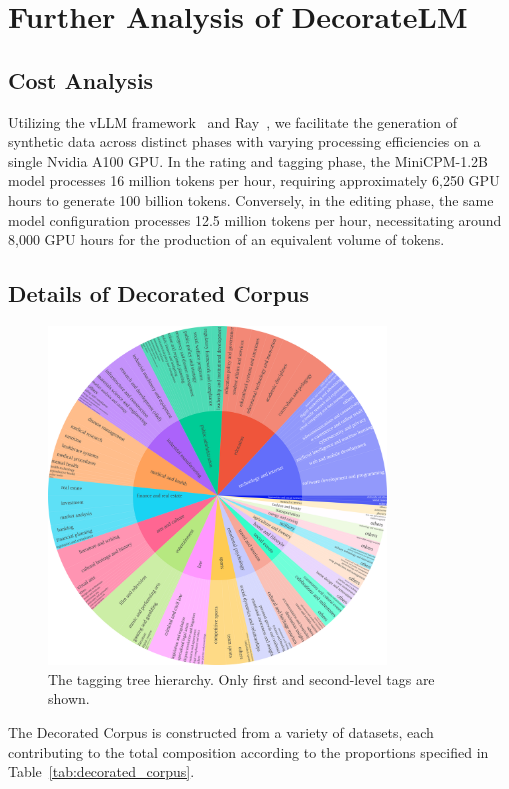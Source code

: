 \documentclass[11pt]{article}
\begin{document}
\section{Further Analysis of DecorateLM}
\subsection{Cost Analysis}
Utilizing the vLLM framework~\citep{kwon2023efficient} and Ray~\citep{moritz2018ray}, we facilitate the generation of synthetic data across distinct phases with varying processing efficiencies on a single Nvidia A100 GPU. In the rating and tagging phase, the MiniCPM-1.2B model processes 16 million tokens per hour, requiring approximately 6,250 GPU hours to generate 100 billion tokens. Conversely, in the editing phase, the same model configuration processes 12.5 million tokens per hour, necessitating around 8,000 GPU hours for the production of an equivalent volume of tokens. 

\subsection{Details of Decorated Corpus}
\begin{figure}[t]
    \centering
    \includegraphics[width=0.8\textwidth]{figs/tagging_tree_hierachy_2nd.pdf}
    \caption{The tagging tree hierarchy. Only first and second-level tags are shown.}
    \label{fig:taggingtree}
\end{figure}


The Decorated Corpus is constructed from a variety of datasets, each contributing to the total composition according to the proportions specified in Table~\ref{tab:decorated_corpus}.
\end{document}
